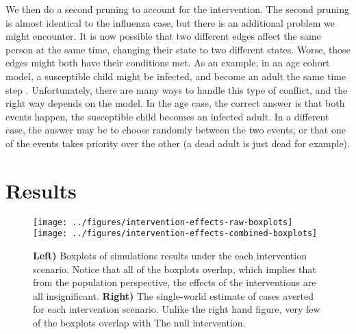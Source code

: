 \documentclass[PTRSB]{rsos}
\begin{document}
We then do a second pruning to account for the intervention.
The second pruning is almost identical to the influenza case, but there is an additional problem we might encounter.
It is now possible that two different edges affect the same person at the same time, changing their state to two different states.
Worse, those edges might both have their conditions met.
As an example, in an age cohort model, a susceptible child might be infected, and become an adult the same time step .
Unfortunately, there are many ways to handle this type of conflict, and the right way depends on the model.
In the age case, the correct answer is that both events happen, the susceptible child becomes an infected adult.
In a different case, the answer may be to choose randomly between the two events, or that one of the events takes priority over the other (a dead adult is just dead for example).



\section{Results}

\begin{figure}\label{fig:boxplots}
\centering
\texttt{[image: ../figures/intervention-effects-raw-boxplots]}
\texttt{[image: ../figures/intervention-effects-combined-boxplots]}
\caption{\textbf{Left)} Boxplots of simulations results under the each intervention scenario.  Notice that all of the boxplots overlap, which implies that from the population perspective, the effects of the interventions are all insignificant.  \textbf{Right)} The single-world estimate of cases averted for each intervention scenario.  Unlike the right hand figure, very few of the boxplots overlap with The null intervention.}
\end{figure}
\end{document}
